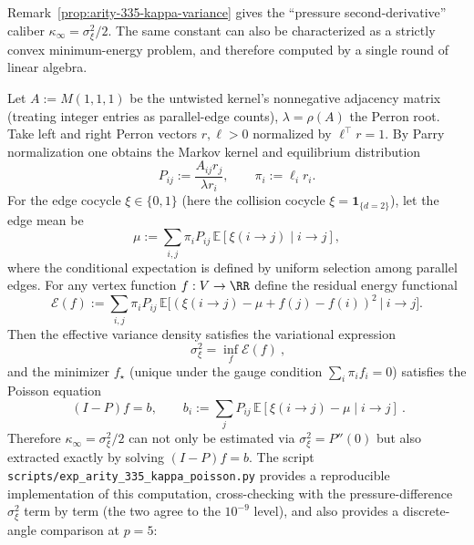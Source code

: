 \begin{remark}\label{rem:arity-335-kappa-poisson}
Remark~\ref{prop:arity-335-kappa-variance} gives the ``pressure second-derivative'' caliber \(\kappa_\infty=\sigma_\xi^2/2\).
The same constant can also be characterized as a strictly convex minimum-energy problem, and therefore computed by a single round of linear algebra.
\par
Let \(A:=M(1,1,1)\) be the untwisted kernel's nonnegative adjacency matrix (treating integer entries as parallel-edge counts), \(\lambda=\rho(A)\) the Perron root.
Take left and right Perron vectors \(r,\ell>0\) normalized by \(\ell^\top r=1\).
By Parry normalization one obtains the Markov kernel and equilibrium distribution
$$
P_{ij}:=\frac{A_{ij}r_j}{\lambda r_i},\qquad \pi_i:=\ell_i r_i.
$$
For the edge cocycle \(\xi\in\{0,1\}\) (here the collision cocycle \(\xi=\mathbf{1}_{\{d=2\}}\)), let the edge mean be
$$
\mu:=\sum_{i,j}\pi_iP_{ij}\,\mathbb{E}[\xi(i\to j)\mid i\to j],
$$
where the conditional expectation is defined by uniform selection among parallel edges.
For any vertex function \(f:V\to\RR\) define the residual energy functional
$$
\mathcal{E}(f):=\sum_{i,j}\pi_iP_{ij}\,\mathbb{E}\Big[(\xi(i\to j)-\mu+f(j)-f(i))^2\ \big|\ i\to j\Big].
$$
Then the effective variance density satisfies the variational expression
$$
\boxed{\ \sigma_\xi^2=\inf_f\mathcal{E}(f)\ },
$$
and the minimizer \(f_\star\) (unique under the gauge condition \(\sum_i\pi_if_i=0\)) satisfies the Poisson equation
$$
\boxed{\ (I-P)f=b,\qquad b_i:=\sum_jP_{ij}\,\mathbb{E}[\xi(i\to j)-\mu\mid i\to j]\ }.
$$
Therefore \(\kappa_\infty=\sigma_\xi^2/2\) can not only be estimated via \(\sigma_\xi^2=P''(0)\) but also extracted exactly by solving \((I-P)f=b\).
The script \texttt{scripts/exp\_arity\_335\_kappa\_poisson.py} provides a reproducible implementation of this computation, cross-checking with the pressure-difference \(\sigma_\xi^2\) term by term (the two agree to the \(10^{-9}\) level), and also provides a discrete-angle comparison at \(p=5\):

\end{remark}

